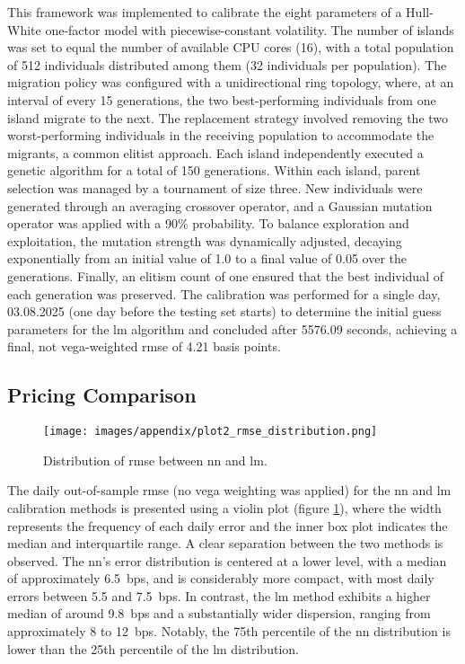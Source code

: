 This framework was implemented to calibrate the eight parameters of a Hull-White one-factor model with piecewise-constant volatility. The number of islands was set to equal the number of available CPU cores (16), with a total population of 512 individuals distributed among them (32 individuals per population). The migration policy was configured with a unidirectional ring topology, where, at an interval of every 15 generations, the two best-performing individuals from one island migrate to the next. The replacement strategy involved removing the two worst-performing individuals in the receiving population to accommodate the migrants, a common elitist approach. Each island independently executed a genetic algorithm for a total of 150 generations. Within each island, parent selection was managed by a tournament of size three. New individuals were generated through an averaging crossover operator, and a Gaussian mutation operator was applied with a 90\% probability. To balance exploration and exploitation, the mutation strength was dynamically adjusted, decaying exponentially from an initial value of 1.0 to a final value of 0.05 over the generations. Finally, an elitism count of one ensured that the best individual of each generation was preserved. The calibration was performed for a single day, 03.08.2025 (one day before the testing set starts) to determine the initial guess parameters for the \ac{lm} algorithm and concluded after 5576.09 seconds, achieving a final, not vega-weighted \ac{rmse} of 4.21 basis points.

\subsection{Pricing Comparison}
\begin{figure}[H]
	\centering
	\texttt{[image: images/appendix/plot2\_rmse\_distribution.png]}
	\caption{Distribution of \ac{rmse} between \ac{nn} and \ac{lm}.}
	\label{fig:distribution_rmse_violin plot}
\end{figure}
The daily out-of-sample \ac{rmse} (no vega weighting was applied) for the \ac{nn} and \ac{lm} calibration methods is presented using a violin plot (figure \ref{fig:distribution_rmse_violin plot}), where the width represents the frequency of each daily error and the inner box plot indicates the median and interquartile range. A clear separation between the two methods is observed. The \ac{nn}'s error distribution is centered at a lower level, with a median of approximately 6.5~\ac{bps}, and is considerably more compact, with most daily errors between 5.5 and 7.5~\ac{bps}. In contrast, the \ac{lm} method exhibits a higher median of around 9.8~\ac{bps} and a substantially wider dispersion, ranging from approximately 8 to 12~\ac{bps}. Notably, the 75th percentile of the \ac{nn} distribution is lower than the 25th percentile of the \ac{lm} distribution.

